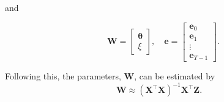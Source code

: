 \documentclass[twocolumn,11pt,a4paper]{article}		%
\begin{document}
and
\begin{small}
\begin{equation*}
\quad \mathbf W=\left[
	\begin{array}{cc}
		\boldsymbol{\theta} \\
		\xi
	\end{array}
	\right],\quad \mathbf{e}=\left[
	\begin{array}{cccc}
		\mathbf e_0\\
		\mathbf e_1\\
		\vdots\\
		\mathbf e_{T-1}
	\end{array}
	\right].
\end{equation*}
\end{small}
Following this, the parameters, $ \mathbf W$, can be estimated by
\begin{equation}
	\mathbf W\approx(\mathbf X^\top\mathbf X)^{-1}\mathbf X^\top\mathbf Z. 
\end{equation}
\end{document}
